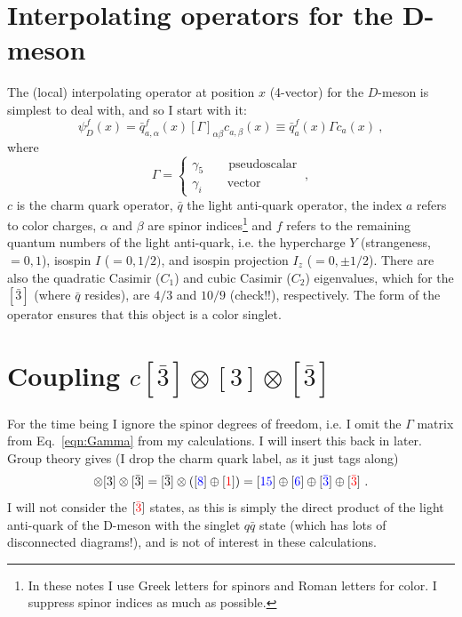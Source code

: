 \documentclass[11pt]{article}
\begin{document}
\section{Interpolating operators for the D-meson}
The (local) interpolating operator at position $x$ (4-vector) for the $D$-meson is simplest to deal with, and so I start with it:
\begin{equation}\label{eqn:D interp}
\psi_D^f(x)= \bar{q}_{a,\alpha}^f(x)[\Gamma]_{\alpha\beta}c_{a,\beta}^{}(x)\equiv  \bar{q}_{a}^f(x)\Gamma c_{a}^{}(x)\ ,
\end{equation}
where 
\begin{equation}\label{eqn:Gamma}
\Gamma=
\begin{cases}
\gamma_5\quad\quad\text{pseudoscalar}\\
\gamma_i\quad\quad\text{vector}
\end{cases}\ ,
\end{equation}
$c$ is the charm quark operator, $\bar{q}$ the light anti-quark operator, the index $a$ refers to color charges, $\alpha$ and $\beta$ are spinor indices\footnote{In these notes I use Greek letters for spinors and Roman letters for color.  I suppress spinor indices as much as possible.} and $f$ refers to the remaining quantum numbers of the light anti-quark, i.e. the hypercharge $Y$ (strangeness, $=0,1$), isospin $I$ ($=0,1/2)$, and isospin projection $I_z$ ($=0,\pm1/2$).    There are also the quadratic Casimir ($C_1$) and cubic Casimir ($C_2$) eigenvalues, which for the $[\bar 3]$ (where $\bar q$ resides), are $4/3$ and $10/9$ (check!!), respectively.  The form of the operator ensures that this object is a color singlet. 

\section{Coupling $c[\bar{3}]\otimes [3]\otimes[\bar{3}]$}
For the time being I ignore the spinor degrees of freedom, i.e. I omit the $\Gamma$ matrix from Eq.~\eqref{eqn:Gamma} from my calculations.  I will insert this back in later.  Group theory gives (I drop the charm quark label, as it just tags along)
\begin{equation}
[\bar{3}]\otimes [3]\otimes[\bar{3}]=[\bar{3}]\otimes ([{\color{blue} 8}]\oplus[{\color{red}1}])
=[{\color{blue}15}]\oplus[{\color{blue}6}]\oplus[{\color{blue}\bar{3}}]\oplus[{\color{red}\bar{3}}]\ .
\end{equation}
I will not consider the $[{\color{red}\bar{3}}]$ states, as this is simply the direct product of the light anti-quark of the D-meson with the singlet $q\bar{q}$ state (which has lots of disconnected diagrams!), and is not of interest in these calculations.
\end{document}
